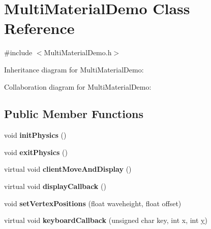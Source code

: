 \hypertarget{class_multi_material_demo}{\section{Multi\+Material\+Demo Class Reference}
\label{class_multi_material_demo}
}


{\ttfamily \#include $<$Multi\+Material\+Demo.\+h$>$}



Inheritance diagram for Multi\+Material\+Demo\+:


Collaboration diagram for Multi\+Material\+Demo\+:
\subsection*{Public Member Functions}
\begin{DoxyCompactItemize}
\item 
\hypertarget{class_multi_material_demo_a7735907d1396916eb58cfcd680d96c4c}{void {\bfseries init\+Physics} ()}\label{class_multi_material_demo_a7735907d1396916eb58cfcd680d96c4c}

\item 
\hypertarget{class_multi_material_demo_a915fc96cb8e27f1f49bc6026de3e6071}{void {\bfseries exit\+Physics} ()}\label{class_multi_material_demo_a915fc96cb8e27f1f49bc6026de3e6071}

\item 
\hypertarget{class_multi_material_demo_ae24269b475a9e26412912ab8b3aaf87d}{virtual void {\bfseries client\+Move\+And\+Display} ()}\label{class_multi_material_demo_ae24269b475a9e26412912ab8b3aaf87d}

\item 
\hypertarget{class_multi_material_demo_ae3f1bb5520f017bd755dd57a910ef2c9}{virtual void {\bfseries display\+Callback} ()}\label{class_multi_material_demo_ae3f1bb5520f017bd755dd57a910ef2c9}

\item 
\hypertarget{class_multi_material_demo_a10a68859fbd19845d291f29e30697ed6}{void {\bfseries set\+Vertex\+Positions} (float waveheight, float offset)}\label{class_multi_material_demo_a10a68859fbd19845d291f29e30697ed6}

\item 
\hypertarget{class_multi_material_demo_a82b3fa961033f7b3af53f1d23bdc07c0}{virtual void {\bfseries keyboard\+Callback} (unsigned char key, int x, int \hyperlink{_ice_utils_8h_aa7ffaed69623192258fb8679569ff9ba}{y})}\label{class_multi_material_demo_a82b3fa961033f7b3af53f1d23bdc07c0}

\end{DoxyCompactItemize}
